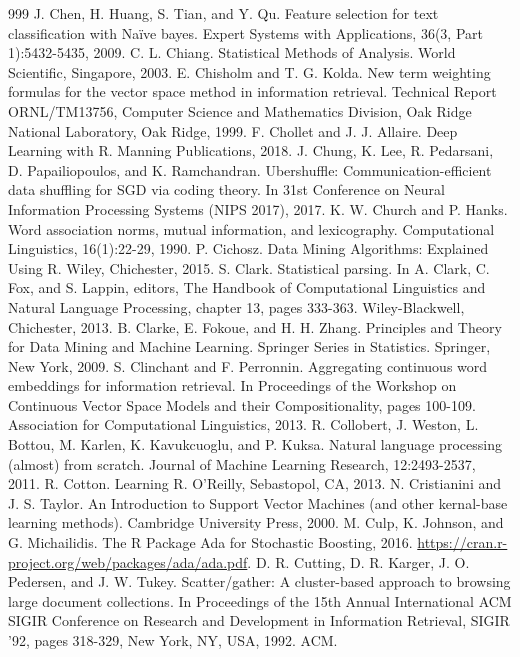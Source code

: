 \documentclass[11pt,openany,executivepaper]{book}
\begin{document}
\begin{thebibliography}{999}
 J. Chen, H. Huang, S. Tian, and Y. Qu. Feature selection for text classification with Naïve bayes. Expert Systems with Applications, 36(3, Part 1):5432-5435, 2009.
 C. L. Chiang. Statistical Methods of Analysis. World Scientific, Singapore, 2003.
 E. Chisholm and T. G. Kolda. New term weighting formulas for the vector space method in information retrieval. Technical Report ORNL/TM13756, Computer Science and Mathematics Division, Oak Ridge National Laboratory, Oak Ridge, 1999.
 F. Chollet and J. J. Allaire. Deep Learning with R. Manning Publications, 2018.
 J. Chung, K. Lee, R. Pedarsani, D. Papailiopoulos, and K. Ramchandran. Ubershuffle: Communication-efficient data shuffling for SGD via coding theory. In 31st Conference on Neural Information Processing Systems (NIPS 2017), 2017.
 K. W. Church and P. Hanks. Word association norms, mutual information, and lexicography. Computational Linguistics, 16(1):22-29, 1990.
 P. Cichosz. Data Mining Algorithms: Explained Using R. Wiley, Chichester, 2015.
 S. Clark. Statistical parsing. In A. Clark, C. Fox, and S. Lappin, editors, The Handbook of Computational Linguistics and Natural Language Processing, chapter 13, pages 333-363. Wiley-Blackwell, Chichester, 2013.
 B. Clarke, E. Fokoue, and H. H. Zhang. Principles and Theory for Data Mining and Machine Learning. Springer Series in Statistics. Springer, New York, 2009.
 S. Clinchant and F. Perronnin. Aggregating continuous word embeddings for information retrieval. In Proceedings of the Workshop on Continuous Vector Space Models and their Compositionality, pages 100-109. Association for Computational Linguistics, 2013.
 R. Collobert, J. Weston, L. Bottou, M. Karlen, K. Kavukcuoglu, and P. Kuksa. Natural language processing (almost) from scratch. Journal of Machine Learning Research, 12:2493-2537, 2011.
 R. Cotton. Learning R. O'Reilly, Sebastopol, CA, 2013.
 N. Cristianini and J. S. Taylor. An Introduction to Support Vector Machines (and other kernal-base learning methods). Cambridge University Press, 2000.
 M. Culp, K. Johnson, and G. Michailidis. The R Package Ada for Stochastic Boosting, 2016. \url{https://cran.r-project.org/web/packages/ada/ada.pdf}.
 D. R. Cutting, D. R. Karger, J. O. Pedersen, and J. W. Tukey. Scatter/gather: A cluster-based approach to browsing large document collections. In Proceedings of the 15th Annual International ACM SIGIR Conference on Research and Development in Information Retrieval, SIGIR '92, pages 318-329, New York, NY, USA, 1992. ACM.

\end{thebibliography}
\end{document}
